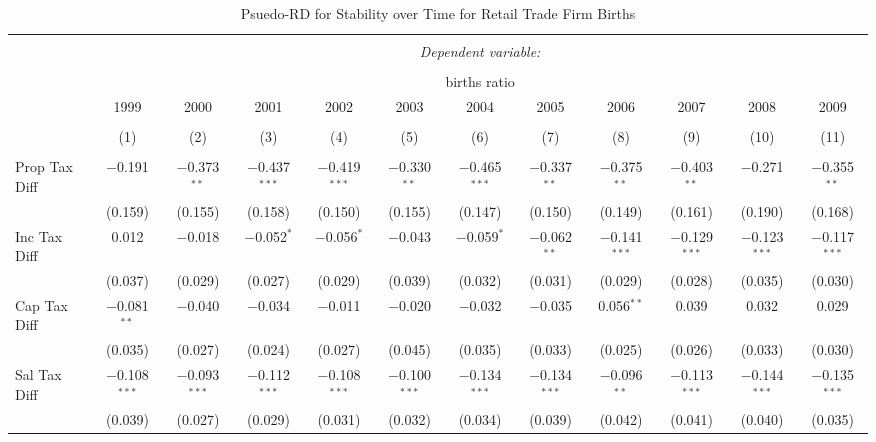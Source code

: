 
\begin{table}[!htbp] \centering 
  \caption{Psuedo-RD for Stability over Time for  Retail Trade Firm Births} 
  \label{44-45year} 
\small 
\begin{tabular}{@{\extracolsep{5pt}}lccccccccccc} 
\\[-1.8ex]\hline 
\hline \\[-1.8ex] 
 & \multicolumn{11}{c}{\textit{Dependent variable:}} \\ 
\cline{2-12} 
\\[-1.8ex] & \multicolumn{11}{c}{births ratio} \\ 
 & 1999 & 2000 & 2001 & 2002 & 2003 & 2004 & 2005 & 2006 & 2007 & 2008 & 2009 \\ 
\\[-1.8ex] & (1) & (2) & (3) & (4) & (5) & (6) & (7) & (8) & (9) & (10) & (11)\\ 
\hline \\[-1.8ex] 
 Prop Tax Diff & $-$0.191 & $-$0.373$^{**}$ & $-$0.437$^{***}$ & $-$0.419$^{***}$ & $-$0.330$^{**}$ & $-$0.465$^{***}$ & $-$0.337$^{**}$ & $-$0.375$^{**}$ & $-$0.403$^{**}$ & $-$0.271 & $-$0.355$^{**}$ \\ 
  & (0.159) & (0.155) & (0.158) & (0.150) & (0.155) & (0.147) & (0.150) & (0.149) & (0.161) & (0.190) & (0.168) \\ 
  Inc Tax Diff & 0.012 & $-$0.018 & $-$0.052$^{*}$ & $-$0.056$^{*}$ & $-$0.043 & $-$0.059$^{*}$ & $-$0.062$^{**}$ & $-$0.141$^{***}$ & $-$0.129$^{***}$ & $-$0.123$^{***}$ & $-$0.117$^{***}$ \\ 
  & (0.037) & (0.029) & (0.027) & (0.029) & (0.039) & (0.032) & (0.031) & (0.029) & (0.028) & (0.035) & (0.030) \\ 
  Cap Tax Diff & $-$0.081$^{**}$ & $-$0.040 & $-$0.034 & $-$0.011 & $-$0.020 & $-$0.032 & $-$0.035 & 0.056$^{**}$ & 0.039 & 0.032 & 0.029 \\ 
  & (0.035) & (0.027) & (0.024) & (0.027) & (0.045) & (0.035) & (0.033) & (0.025) & (0.026) & (0.033) & (0.030) \\ 
  Sal Tax Diff & $-$0.108$^{***}$ & $-$0.093$^{***}$ & $-$0.112$^{***}$ & $-$0.108$^{***}$ & $-$0.100$^{***}$ & $-$0.134$^{***}$ & $-$0.134$^{***}$ & $-$0.096$^{**}$ & $-$0.113$^{***}$ & $-$0.144$^{***}$ & $-$0.135$^{***}$ \\ 
  & (0.039) & (0.027) & (0.029) & (0.031) & (0.032) & (0.034) & (0.039) & (0.042) & (0.041) & (0.040) & (0.035) \\ 

\end{tabular}
\end{table}
